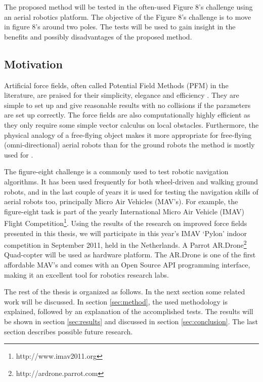\documentclass[11pt]{article}
\begin{document}
The proposed method will be tested in the often-used Figure 8's challenge using an aerial robotics platform. The objective of the Figure 8's challenge is to move in figure 8's around two poles. The tests will be used to gain insight in the benefits and possibly disadvantages of the proposed method.



\subsection{Motivation}
\label{sec:motivation}


Artificial force fields, often called Potential Field Methods (PFM) in the literature, are praised for their simplicity, elegance and efficiency \cite{koren91}. They are simple to set up and give reasonable results with no collisions if the parameters are set up correctly. The force fields are also computationally highly efficient as they only require some simple vector calculus on local obstacles. Furthermore, the physical analogy of a free-flying object makes it more appropriate for free-flying (omni-directional) aerial robots than for the ground robots the method is mostly used for \cite{burgard99}. %

The figure-eight challenge is a commonly used to test robotic navigation algorithms. %
It has been used frequently for both wheel-driven and walking ground robots, and in the last couple of years it is used for testing the navigation skills of aerial robots too, principally Micro Air Vehicles (MAV's). For example, the figure-eight task is part of the yearly International Micro Air Vehicle (IMAV) Flight Competition\footnote{http://www.imav2011.org}. Using the results of the research on improved force fields presented in this thesis, we will participate in this year's IMAV `Pylon' indoor competition in September 2011, held in the Netherlands. A Parrot AR.Drone\footnote{http://ardrone.parrot.com} Quad-copter will be used as hardware platform. The AR.Drone is one of the first affordable MAV's and comes with an Open Source API programming interface, making it an excellent tool for robotics research labs.

The rest of the thesis is organized as follows. In the next section some related work will be discussed. In section \ref{sec:method}, the used methodology is explained, followed by an explanation of the accomplished tests. The results will be shown in section \ref{sec:results} and discussed in section \ref{sec:conclusion}. The last section describes possible future research.
\end{document}
